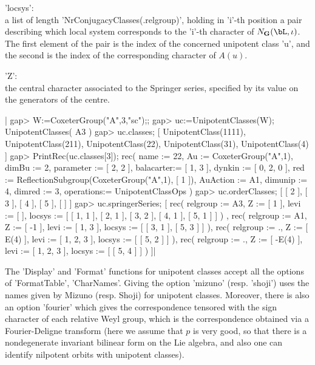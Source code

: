 'locsys':\\  a list  of length  'NrConjugacyClasses(.relgroup)', holding in
'i'-th  position a  pair describing  which local  system corresponds to the
'i'-th  character of $N_\bG(\bL,\iota)$.  The first element  of the pair is
the index of the concerned unipotent class 'u', and the second is the index
of the corresponding character of $A(u)$.

'Z':\\  the central character associated  to the Springer series, specified
by its value on the generators of the centre.

|    gap> W:=CoxeterGroup("A",3,"sc");;
    gap> uc:=UnipotentClasses(W);
    UnipotentClasses( A3 )
    gap> uc.classes;
    [ UnipotentClass(1111), UnipotentClass(211), UnipotentClass(22),
      UnipotentClass(31), UnipotentClass(4) ]
    gap> PrintRec(uc.classes[3]);
    rec(
      name      := 22,
      Au        := CoxeterGroup("A",1),
      dimBu     := 2,
      parameter := [ 2, 2 ],
      balacarter:= [ 1, 3 ],
      dynkin    := [ 0, 2, 0 ],
      red       := ReflectionSubgroup(CoxeterGroup("A",1), [ 1 ]),
      AuAction  := A1,
      dimunip   := 4,
      dimred    := 3,
      operations:= UnipotentClassOps )
    gap> uc.orderClasses;
    [ [ 2 ], [ 3 ], [ 4 ], [ 5 ], [  ] ]
    gap> uc.springerSeries;
    [ rec(
          relgroup := A3,
          Z := [ 1 ],
          levi := [  ],
          locsys := [ [ 1, 1 ], [ 2, 1 ], [ 3, 2 ], [ 4, 1 ], [ 5, 1 ] ] )
        , rec(
          relgroup := A1,
          Z := [ -1 ],
          levi := [ 1, 3 ],
          locsys := [ [ 3, 1 ], [ 5, 3 ] ] ), rec(
          relgroup := .,
          Z := [ E(4) ],
          levi := [ 1, 2, 3 ],
          locsys := [ [ 5, 2 ] ] ), rec(
          relgroup := .,
          Z := [ -E(4) ],
          levi := [ 1, 2, 3 ],
          locsys := [ [ 5, 4 ] ] ) ]|

The  'Display' and 'Format' functions for  unipotent classes accept all the
options  of 'FormatTable',  'CharNames'. Giving  the option 'mizuno' (resp.
'shoji')  uses  the  names  given  by  Mizuno  (resp.  Shoji) for unipotent
classes.  Moreover,  there  is  also  an  option  'fourier' which gives the
correspondence  tensored  with  the  sign  character  of each relative Weyl
group, which is the correspondence obtained via a Fourier-Deligne transform
(here  we assume that  $p$ is very  good, so that  there is a nondegenerate
invariant  bilinear  form  on  the  Lie  algebra, and also one can identify
nilpotent orbits with unipotent classes).

